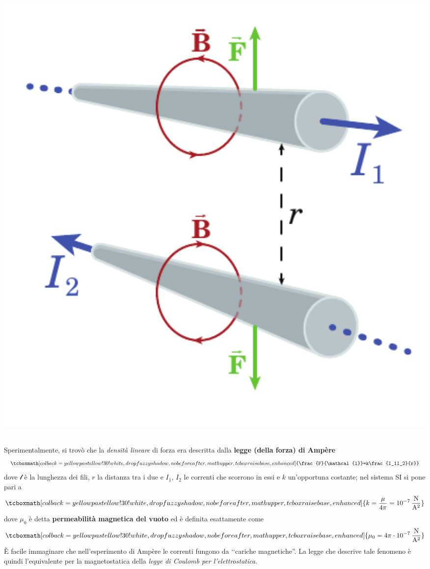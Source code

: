 \begin{minipage}{0.49\textwidth}
	\begin{center}
		\includegraphics[width=1\textwidth]{images/chp7/chp7ampere2.pdf}
	\end{center}
\end{minipage}\\
Sperimentalmente, si trovò che la \textit{densità lineare} di forza era descritta dalla \textbf{legge (della forza) di Ampère}
\begin{equation}
	\tcboxmath[colback=yellowpastellow!30!white,drop fuzzy shadow, nobeforeafter, math upper, tcbox raise base, enhanced]{\frac{F}{\mathcal{l}}=k\frac{I_1I_2}{r}}
\end{equation}
dove $\mathcal{l}$ è la lunghezza dei fili, $r$ la distanza tra i due e $I_1$, $I_2$ le correnti che scorrono in essi e $k$ un'opportuna costante; nel sistema SI si pone pari a
\begin{equation}
	\tcboxmath[colback=yellowpastellow!30!white,drop fuzzy shadow, nobeforeafter, math upper, tcbox raise base, enhanced]{k=\frac{\mu}{4\pi}=\SI[per-mode = fraction]{d-7}{\newton\per\ampere\squared}}
\end{equation}
dove $\mu_0$ è detta \textbf{permeabilità magnetica del vuoto} ed è definita esattamente come
\begin{equation}
	\tcboxmath[colback=yellowpastellow!30!white,drop fuzzy shadow, nobeforeafter, math upper, tcbox raise base, enhanced]{\mu_0=4\pi\cdot\SI[per-mode = fraction]{d-7}{\newton\per\ampere\squared}}
\end{equation}
È facile immaginare che nell'esperimento di Ampère le correnti fungono da ‘‘cariche magnetiche''. La legge che descrive tale fenomeno è quindi l'equivalente per la magnetostatica della \textit{legge di Coulomb per l'elettrostatica}.
